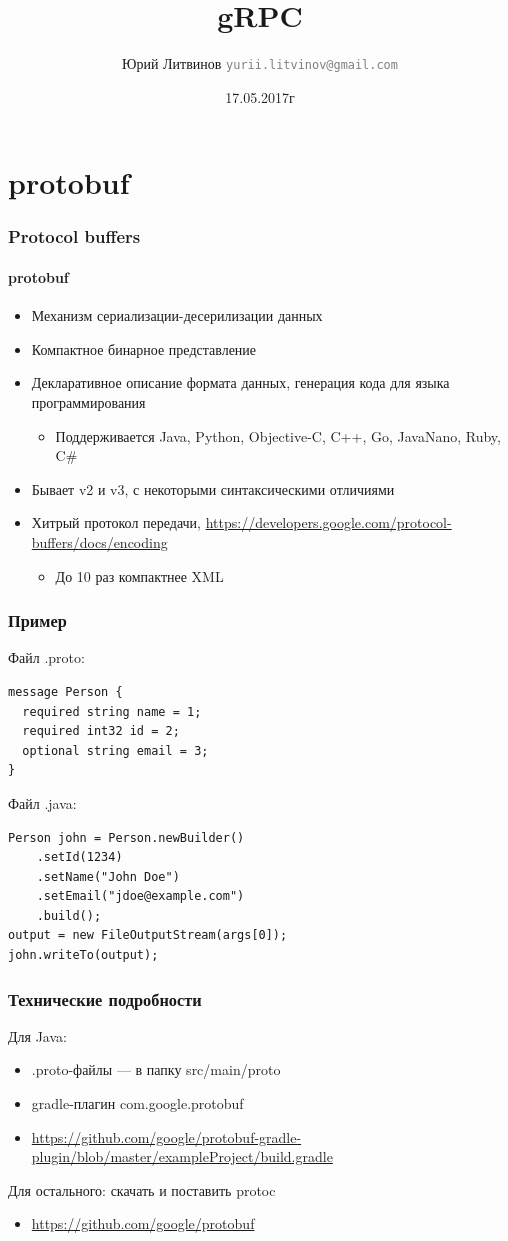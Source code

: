 \documentclass[xetex,mathserif,serif]{beamer}
\title{gRPC}
\author[Юрий Литвинов]{Юрий Литвинов \newline \textcolor{gray}{\small\texttt{yurii.litvinov@gmail.com}}}
\date{17.05.2017г}
\begin{document}
	
	\frame{\titlepage}

	\section{protobuf}

	\begin{frame}
		\frametitle{Protocol buffers}
		\framesubtitle{protobuf}
		\begin{itemize}
			\item Механизм сериализации-десерилизации данных
			\item Компактное бинарное представление
			\item Декларативное описание формата данных, генерация кода для языка программирования
			\begin{itemize}
				\item Поддерживается Java, Python, Objective-C, C++, Go, JavaNano, Ruby, C\#
			\end{itemize}
			\item Бывает v2 и v3, с некоторыми синтаксическими отличиями
			\item Хитрый протокол передачи, \url{https://developers.google.com/protocol-buffers/docs/encoding}
			\begin{itemize}
				\item До 10 раз компактнее XML 
			\end{itemize}
		\end{itemize}
	\end{frame}

	\begin{frame}[fragile]
		\frametitle{Пример}
		Файл .proto:
		\begin{verbatim}
message Person {
  required string name = 1;
  required int32 id = 2;
  optional string email = 3;
}
		\end{verbatim}
		Файл .java:
\begin{verbatim}
Person john = Person.newBuilder()
    .setId(1234)
    .setName("John Doe")
    .setEmail("jdoe@example.com")
    .build();
output = new FileOutputStream(args[0]);
john.writeTo(output);
\end{verbatim}
\end{frame}

	\begin{frame}
		\frametitle{Технические подробности}
		Для Java:
		\begin{itemize}
			\item .proto-файлы --- в папку src/main/proto
			\item gradle-плагин com.google.protobuf
			\item \url{https://github.com/google/protobuf-gradle-plugin/blob/master/exampleProject/build.gradle}
		\end{itemize}
		Для остального: скачать и поставить protoc
		\begin{itemize}
			\item \url{https://github.com/google/protobuf}
		\end{itemize}
	\end{frame}
\end{document}
